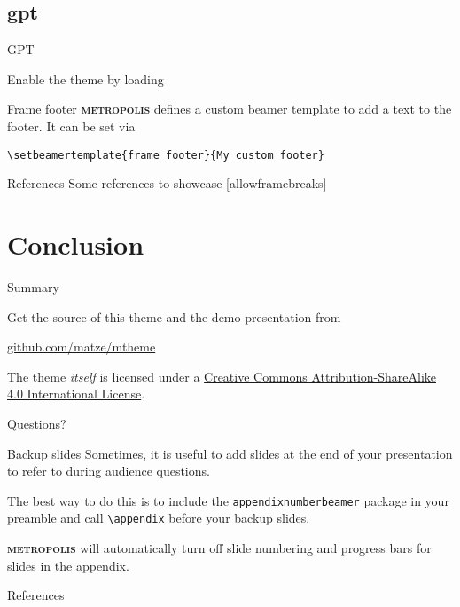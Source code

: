 \documentclass[10pt]{beamer}
\newcommand{\themename}{\textbf{\textsc{metropolis}}\xspace}
\begin{document}
\subsection[GPT]{gpt}

\begin{frame}[fragile]{GPT}

	Enable the theme by loading

\end{frame}

{%
\begin{frame}[fragile]{Frame footer}
	\themename defines a custom beamer template to add a text to the footer. It can be set via
	\begin{verbatim}\setbeamertemplate{frame footer}{My custom footer}\end{verbatim}
\end{frame}
}

\begin{frame}{References}
	Some references to showcase [allowframebreaks] \cite{knuth92,ConcreteMath,Simpson,Er01,greenwade93}
\end{frame}

\section{Conclusion}

\begin{frame}{Summary}

	Get the source of this theme and the demo presentation from

	\begin{center}\url{github.com/matze/mtheme}\end{center}

	The theme \emph{itself} is licensed under a
	\href{http://creativecommons.org/licenses/by-sa/4.0/}{Creative Commons
		Attribution-ShareAlike 4.0 International License}.

	\begin{center}\ccbysa\end{center}

\end{frame}

{
\begin{frame}[standout]
	Questions?
\end{frame}
}

\appendix

\begin{frame}[fragile]{Backup slides}
	Sometimes, it is useful to add slides at the end of your presentation to
	refer to during audience questions.

	The best way to do this is to include the \verb|appendixnumberbeamer|
	package in your preamble and call \verb|\appendix| before your backup slides.

	\themename will automatically turn off slide numbering and progress bars for
	slides in the appendix.
\end{frame}

\begin{frame}[allowframebreaks]{References}

	
	

\end{frame}
\end{document}
